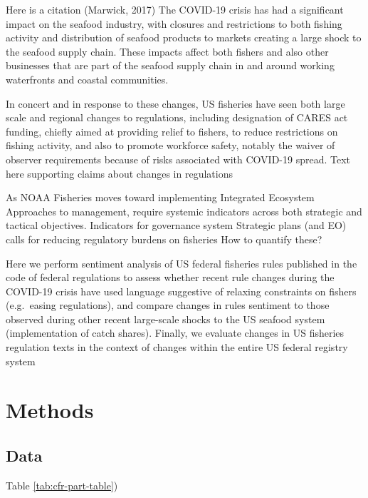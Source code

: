 \documentclass[
]{article}
\begin{document}
Here is a citation (Marwick, 2017)
The COVID-19 crisis has had a significant impact on the seafood industry, with closures and restrictions to both fishing activity and distribution of seafood products to markets creating a large shock to the seafood supply chain. These impacts affect both fishers and also other businesses that are part of the seafood supply chain in and around working waterfronts and coastal communities.

In concert and in response to these changes, US fisheries have seen both large scale and regional changes to regulations, including designation of CARES act funding, chiefly aimed at providing relief to fishers, to reduce restrictions on fishing activity, and also to promote workforce safety, notably the waiver of observer requirements because of risks associated with COVID-19 spread.
Text here supporting claims about changes in regulations

As NOAA Fisheries moves toward implementing Integrated Ecosystem Approaches to management, require systemic indicators across both strategic and tactical objectives.
Indicators for governance system
Strategic plans (and EO) calls for reducing regulatory burdens on fisheries
How to quantify these?

Here we perform sentiment analysis of US federal fisheries rules published in the code of federal regulations to assess whether recent rule changes during the COVID-19 crisis have used language suggestive of relaxing constraints on fishers (e.g.~easing regulations), and compare changes in rules sentiment to those observed during other recent large-scale shocks to the US seafood system (implementation of catch shares). Finally, we evaluate changes in US fisheries regulation texts in the context of changes within the entire US federal registry system

\hypertarget{methods}{%
\section{Methods}\label{methods}}

\hypertarget{data}{%
\subsection{Data}\label{data}}

Table \ref{tab:cfr-part-table})
\end{document}
